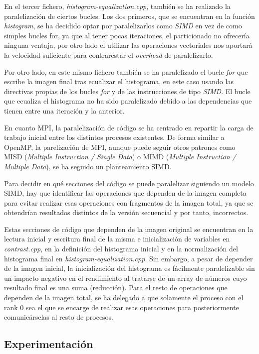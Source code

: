\documentclass[12pt]{report} %
\begin{document}
En el tercer fichero, \textit{histogram-equalization.cpp}, también se ha realizado la paralelización
de ciertos bucles. Los dos primeros, que se encuentran en la función \textit{histogram}, se ha decidido
optar por paralelizarlos como \textit{SIMD} en vez de como simples bucles for, ya que al tener pocas
iteraciones, el particionado no ofrecería ninguna ventaja, por otro lado el utilizar las operaciones
vectoriales nos aportará la velocidad suficiente para contrarestar el \textit{overhead} de paralelizarlo.

Por otro lado, en este mismo fichero también se ha paralelizado el bucle \textit{for} que escribe la imagen
final tras ecualizar el histograma, en este caso usando las directivas propias de los bucles \textit{for} y
de las instrucciones de tipo \textit{SIMD}. El bucle que ecualiza el histograma no ha sido paralelizado
debido a las dependencias que tienen entre una iteración y la anterior.

En cuanto MPI, la paralelización de código se ha centrado en repartir la carga de trabajo inicial entre los distintos
procesos existentes. De forma similar a OpenMP, la parelización de MPI, aunque puede seguir otros
patrones como MISD (\textit{Multiple Instruction / Single Data}) o MIMD (\textit{Multiple Instruction
/ Multiple Data}), se ha seguido un planteamiento SIMD.

Para decidir en qué secciones del código se puede paralelizar siguiendo un modelo SIMD, hay que identificar
las operaciones que dependen de la imagen completa para evitar realizar esas operaciones con fragmentos de
la imagen total, ya que se obtendrían resultados distintos de la versión secuencial y por tanto, incorrectos.

Estas secciones de código que dependen de la imagen original se encuentran en la lectura inicial y escritura
final de la misma e inicialización de variables en \textit{contrast.cpp}, en la definición del histograma
inicial y en la normalización del histograma final en \textit{histogram-equalization.cpp}. Sin embargo,
a pesar de depender de la imagen inicial, la inicialización del histograma es fácilmente paralelizable sin
un impacto negativo en el rendimiento al tratarse de un array de números cuyo resultado final es una suma (reducción).
Para el resto de operaciones que dependen de la imagen total, se ha delegado a que solamente el proceso
con el rank 0 sea el que se encarge de realizar esas operaciones para posteriormente comunicárselas al
resto de procesos.

\subsection{Experimentación}
\end{document}
